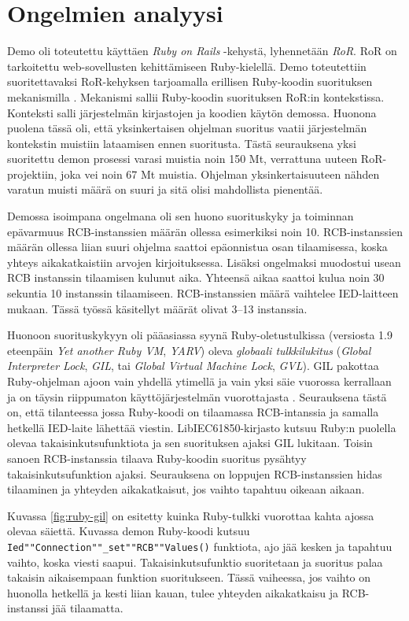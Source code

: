 \section{Ongelmien analyysi}
Demo oli toteutettu käyttäen \emph{Ruby on Rails} -kehystä, lyhennetään \emph{RoR}. RoR on tarkoitettu web-sovellusten kehittämiseen Ruby-kielellä. Demo toteutettiin suoritettavaksi RoR-kehyksen tarjoamalla erillisen Ruby-koodin suorituksen mekanismilla \cite{rails-runner}. Mekanismi sallii Ruby-koodin suorituksen RoR:in kontekstissa. Konteksti salli järjestelmän kirjastojen ja koodien käytön demossa. Huonona puolena tässä oli, että yksinkertaisen ohjelman suoritus vaatii järjestelmän kontekstin muistiin lataamisen ennen suoritusta. Tästä seurauksena yksi suoritettu demon prosessi varasi muistia noin 150 Mt, verrattuna uuteen RoR-projektiin, joka vei noin 67 Mt muistia. Ohjelman yksinkertaisuuteen nähden varatun muisti määrä on suuri ja sitä olisi mahdollista pienentää.

Demossa isoimpana ongelmana oli sen huono suorituskyky ja toiminnan epävarmuus RCB-instanssien määrän ollessa esimerkiksi noin 10. RCB-instanssien määrän ollessa liian suuri ohjelma saattoi epäonnistua osan tilaamisessa, koska yhteys aikakatkaistiin arvojen kirjoituksessa. Lisäksi ongelmaksi muodostui usean RCB instanssin tilaamisen kulunut aika. Yhteensä aikaa saattoi kulua noin 30 sekuntia 10 instanssin tilaamiseen. RCB-instanssien määrä vaihtelee IED-laitteen mukaan. Tässä työssä käsitellyt määrät olivat 3--13 instanssia.

Huonoon suorituskykyyn oli pääasiassa syynä Ruby-oletustulkissa (versiosta 1.9 eteenpäin \emph{Yet another Ruby VM}, \emph{YARV}) oleva \emph{globaali tulkkilukitus} (\emph{Global Interpreter Lock}, \emph{GIL}, tai \emph{Global Virtual Machine Lock}, \emph{GVL}). GIL pakottaa Ruby-ohjelman ajoon vain yhdellä ytimellä ja vain yksi säie vuorossa kerrallaan ja on täysin riippumaton käyttöjärjestelmän vuorottajasta \mbox{\cite[s.~131--133]{Odaira2014}}. Seurauksena tästä on, että tilanteessa jossa Ruby-koodi on tilaamassa RCB-intanssia ja samalla hetkellä IED-laite lähettää viestin. LibIEC61850-kirjasto kutsuu Ruby:n puolella olevaa takaisinkutsufunktiota ja sen suorituksen ajaksi GIL lukitaan. Toisin sanoen RCB-instanssia tilaava Ruby-koodin suoritus pysähtyy takaisinkutsufunktion ajaksi. Seurauksena on loppujen RCB-instanssien hidas tilaaminen ja yhteyden aikakatkaisut, jos vaihto tapahtuu oikeaan aikaan.

Kuvassa \ref{fig:ruby-gil} on esitetty kuinka Ruby-tulkki vuorottaa kahta ajossa olevaa säiettä. Kuvassa demon Ruby-koodi kutsuu \texttt{Ied""Connection""\_set""RCB""Values()} funktiota, ajo jää kesken ja tapahtuu vaihto, koska viesti saapui. Takaisinkutsufunktio suoritetaan ja suoritus palaa takaisin aikaisempaan funktion suoritukseen. Tässä vaiheessa, jos vaihto on huonolla hetkellä ja kesti liian kauan, tulee yhteyden aikakatkaisu ja RCB-instanssi jää tilaamatta.

